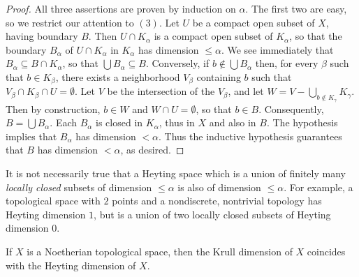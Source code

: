 \begin{proof}
All three assertions are proven by induction on $\alpha$. The
first two are easy, so we restrict our attention to $(3)$. Let $U$
be a compact open subset of $X$, having boundary $B$. Then $U \cap
K_{\alpha}$ is a compact open subset of $K_{\alpha}$, so that the
boundary $B_{\alpha}$ of $U \cap K_{\alpha}$ in $K_{\alpha}$ has
dimension $\leq \alpha$. We see immediately that $B_{\alpha}
\subseteq B \cap K_{\alpha}$, so that $\bigcup B_{\alpha}
\subseteq B$. Conversely, if $b \notin \bigcup B_{\alpha}$ then,
for every $\beta$ such that $b \in K_{\beta}$, there exists a
neighborhood $V_{\beta}$ containing $b$ such that $V_{\beta} \cap
K_{\beta} \cap U = \emptyset$. Let $V$ be the intersection of the
$V_{\beta}$, and let $W = V - \bigcup_{b \notin K_{\gamma}}
K_{\gamma}$. Then by construction, $b \in W$ and $W \cap U =
\emptyset$, so that $b \in B$. Consequently, $B = \bigcup
B_{\alpha}$. Each $B_{\alpha}$ is closed in $K_{\alpha}$, thus in
$X$ and also in $B$. The hypothesis implies that $B_{\alpha}$ has
dimension $< \alpha$. Thus the inductive hypothesis guarantees
that $B$ has dimension $< \alpha$, as desired.
\end{proof}

\begin{remark}\label{DVR}
It is not necessarily true that a Heyting space which is a union
of finitely many {\em locally closed} subsets of dimension $\leq
\alpha$ is also of dimension $\leq \alpha$. For example, a
topological space with $2$ points and a nondiscrete, nontrivial
topology has Heyting dimension $1$, but is a union of two locally
closed subsets of Heyting dimension $0$.
\end{remark}

\begin{proposition}\label{krullheyt}
If $X$ is a Noetherian topological space, then the Krull
dimension of $X$ coincides with the Heyting dimension of $X$.
\end{proposition}

